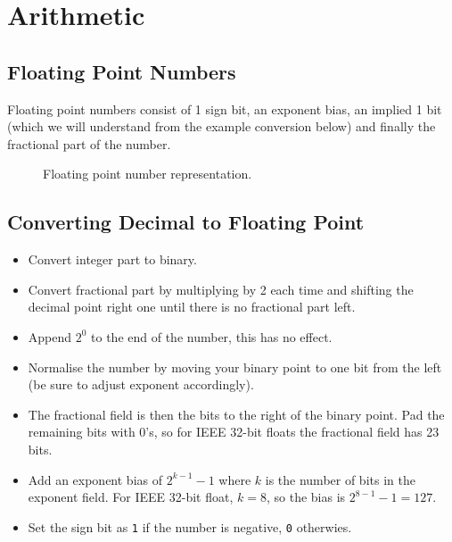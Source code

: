 \section{Arithmetic}

\subsection{Floating Point Numbers}
Floating point numbers consist of 1 sign bit, an exponent bias, an implied 1 bit (which we will understand from the example conversion below) and finally the fractional part of the number.
\begin{figure}[H]
\centering
{}
\caption{Floating point number representation. }
\end{figure}

\subsection{Converting Decimal to Floating Point}
\begin{itemize}
    \item Convert integer part to binary.
    \item Convert fractional part by multiplying by 2 each time and shifting the decimal point right one until there is no fractional part left.
    \item Append $2^0$ to the end of the number, this has no effect.
    \item Normalise the number by moving your binary point to one bit from the left (be sure to adjust exponent accordingly).
    \item The fractional field is then the bits to the right of the binary point. Pad the remaining bits with 0's, so for IEEE 32-bit floats the fractional field has 23 bits.
    \item Add an exponent bias of $2^{k-1}-1$ where $k$ is the number of bits in the exponent field. For IEEE 32-bit float, $k=8$, so the bias is $2^{8-1}-1=127$. 
    \item Set the sign bit as \texttt{1} if the number is negative, \texttt{0} otherwies.
\end{itemize}

